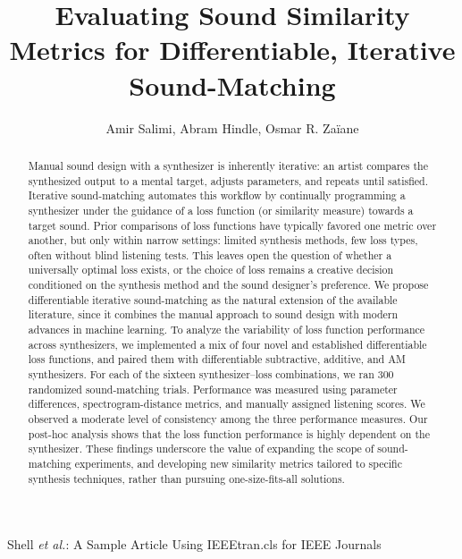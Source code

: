 \documentclass[lettersize,journal]{IEEEtran}
\begin{document}
\title{Evaluating Sound Similarity Metrics for Differentiable, Iterative Sound-Matching}

\author{Amir Salimi, Abram Hindle, Osmar R. Za{\"i}ane}

%
{Shell \MakeLowercase{\textit{et al.}}: A Sample Article Using IEEEtran.cls for IEEE Journals}

\maketitle

\begin{abstract}
Manual sound design with a synthesizer is inherently iterative: an artist compares the synthesized output to a mental target, adjusts parameters, and repeats until satisfied. Iterative sound-matching automates this workflow by continually programming a synthesizer under the guidance of a loss function (or similarity measure) towards a target sound. Prior comparisons of loss functions have typically favored one metric over another, but only within narrow settings: limited synthesis methods, few loss types, often without blind listening tests. This leaves open the question of whether a universally optimal loss exists, or the choice of loss remains a creative decision conditioned on the synthesis method and the sound designer's preference. We propose differentiable iterative sound-matching as the natural extension of the available literature, since it combines the manual approach to sound design with modern advances in machine learning. To analyze the variability of loss function performance across synthesizers, we implemented a mix of four novel and established differentiable loss functions, and paired them with differentiable subtractive, additive, and AM synthesizers. For each of the sixteen synthesizer–loss combinations, we ran 300 randomized sound-matching trials. Performance was measured using parameter differences, spectrogram-distance metrics, and manually assigned listening scores. We observed a moderate level of consistency among the three performance measures. Our post-hoc analysis shows that the loss function performance is highly dependent on the synthesizer. These findings underscore the value of expanding the scope of sound-matching experiments, and developing new similarity metrics tailored to specific synthesis techniques, rather than pursuing one-size-fits-all solutions.
\end{abstract}
\end{document}

